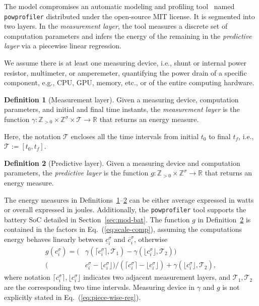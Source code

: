 \documentclass[letterpaper,10pt,journal,twoside]{IEEEtran}
\newcommand{\stt}[1]{{\small\tt #1}} %
\newcommand{\powprof}{\stt{powprofiler}}
\theoremstyle{definition}
\newtheorem{defn}{Definition}[section]
\begin{document}
The model compromises an automatic modeling and profiling tool~\cite{seewald2019coarse} named \powprof{} distributed %
under the open-source MIT license. It is segmented into two layers. In the \emph{measurement layer}, the tool measures a discrete set of computation parameters and infers the energy of the remaining in the \emph{predictive layer} via a piecewise linear regression.

We assume there is at least one measuring device, i.e., shunt or internal power resistor, multimeter, or amperemeter, quantifying the power drain of a specific component, e.g., CPU, GPU, memory, etc., or of the entire computing hardware.

\begin{defn}[Measurement layer]\label{def:meas}
  Given a measuring device, computation parameters, and initial and final time instants, the \emph{measurement layer} is the function $\gamma:\mathbb{Z}_{>0}\times\mathbb{Z}^\sigma\times\mathcal{T}\rightarrow\mathbb{R}$ that returns an energy measure.
\end{defn}

Here, the notation $\mathcal{T}$ encloses all the time intervals from initial $t_0$ to final $t_f$, i.e., $\mathcal{T}:=[t_0,t_f]$.

\begin{defn}[Predictive layer]\label{def:pred}
  Given a measuring device and computation parameters, the \emph{predictive layer} is the function $g:\mathbb{Z}_{>0}\times\mathbb{Z}^\sigma\rightarrow\mathbb{R}$ that returns an energy measure.
\end{defn}

The energy measures in Definitions~\ref{def:meas}--\hyperref[def:pred]{2} can be either average expressed in watts or overall expressed in joules. Additionally, the \powprof{} tool supports the battery SoC detailed in Section~\ref{sec:mod-bat}. The function $g$ in Definition~\ref{def:pred} is contained in the %
factors in Eq.~(\ref{eq:scale-comp}), assuming the computations energy behaves linearly between $\underline{c}_i^\sigma$ and $\overline{c}_i^\sigma$, otherwise
\begin{equation}\label{eq:piece-wise-reg}\begin{split}
  g(c_i^\sigma)=(&\gamma(\lceil c_i^\sigma\rceil,\mathcal{T}_1)-\gamma(\lfloor c_i^\sigma\rfloor,\mathcal{T}_2))\\(&c_i^\sigma-\lfloor c_i^\sigma\rfloor)/(\lceil c_i^\sigma\rceil-\lfloor c_i^\sigma\rfloor)+\gamma(\lfloor c_i^\sigma\rfloor,\mathcal{T}_2),
\end{split}\end{equation}
where notation $\lceil c_i^\sigma\rceil,\lfloor c_i^\sigma\rfloor$ indicates two adjacent measurement layers, and $\mathcal{T}_1,\mathcal{T}_2$ are the corresponding two time intervals. {\color{blue}M}easuring device in $\gamma$ and $g$ is {\color{blue}not explicitly stated in Eq.~(\ref{eq:piece-wise-reg})}.
\end{document}
